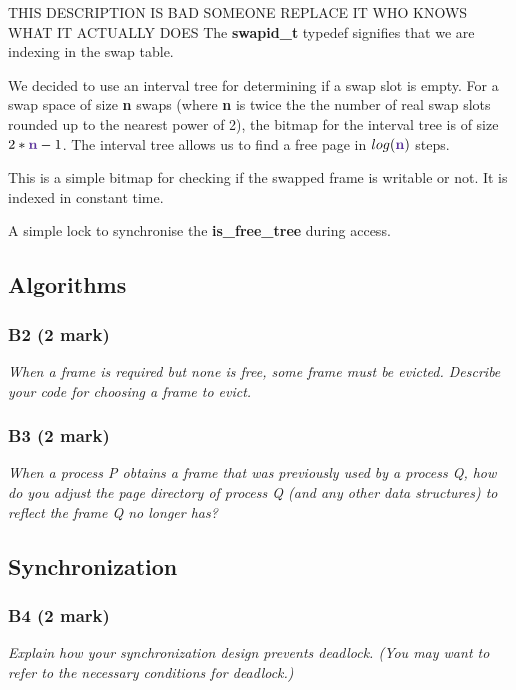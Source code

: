\documentclass{report}
\newcommand{\question}[1]{\textit{#1} \ }
\newcommand{\file}[1]{\textcolor{YellowGreen}{\textbf{#1}}}
\newcommand{\var}[1]{\textcolor{RoyalPurple}{\textbf{#1}}}
\newcommand{\pintoscode}[4]{}
\newcommand{\pintosfile}[3]{\pintoscode{#1}{#2}{\file{#3}}{#3}}
\begin{document}
				\pintosfile{9}{9}{swap.h}
					THIS DESCRIPTION IS BAD SOMEONE REPLACE IT WHO KNOWS WHAT IT ACTUALLY DOES
					The \var{swapid\_t} typedef signifies that we are indexing in the
					swap table.
				
				\pintosfile{12}{12}{swap.c}
					We decided to use an interval tree for determining if a swap slot is empty.
					For a swap space of size \var{n} swaps (where \var{n} is twice the
					the number of real swap slots rounded up to the nearest power of 2), 
					the bitmap for the interval tree is
					of size $2*\var{n}-1$. The interval tree allows us to find a free page in 
					$log(\var{n})$ steps.
				
				\pintosfile{13}{13}{swap.c}
					This is a simple bitmap for checking if the swapped frame is writable or not. 
					It is indexed in constant time.

				\pintosfile{15}{15}{swap.c}
					A simple lock to synchronise the \var{is\_free\_tree} during access.
		
		\subsection*{Algorithms}
			\subsubsection*{B2 (2 mark)}
				\question{When a frame is required but none is free, some frame must be evicted.
				Describe your code for choosing a frame to evict.}
			
			\subsubsection*{B3 (2 mark)}
				\question{When a process P obtains a frame that was previously used by a 
				process Q, how do you adjust the page directory of process Q 
				(and any other data structures) to reflect the frame Q no longer has?}

		\subsection*{Synchronization}
			\subsubsection*{B4 (2 mark)}
				\question{Explain how your synchronization design prevents deadlock.
				(You may want to refer to the necessary conditions for deadlock.)}
\end{document}
